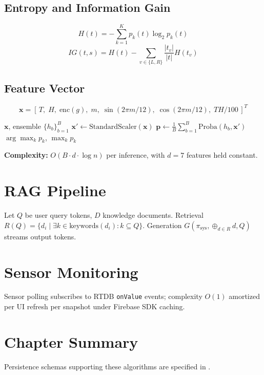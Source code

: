 \subsection{Entropy and Information Gain}
\begin{equation}
H(t) = - \sum_{k=1}^{K} p_k(t) \log_2 p_k(t)
\label{eq:entropy}
\end{equation}
\begin{equation}
IG(t,s) = H(t) - \sum_{v \in \{L,R\}} \frac{|t_v|}{|t|} H(t_v)
\label{eq:ig}
\end{equation}

\subsection{Feature Vector}
\begin{equation}
\mathbf{x} = [\,T,\; H,\; \text{enc}(g),\; m,\; \sin(2\pi m/12),\; \cos(2\pi m/12),\; TH/100\,]^T
\label{eq:feature_vector}
\end{equation}

\begin{algorithm}[htbp]
\caption{Random Forest Inference}
\label{alg:rf_infer}
\begin{algorithmic}[1]
\Require $\mathbf{x}$, ensemble $\{h_b\}_{b=1}^B$
\State $\mathbf{x}' \gets \text{StandardScaler}(\mathbf{x})$
\State $\mathbf{p} \gets \frac{1}{B}\sum_{b=1}^B \text{Proba}(h_b, \mathbf{x}')$
\State \Return $\arg\max_k p_k$, $\max_k p_k$
\end{algorithmic}
\end{algorithm}

\textbf{Complexity:} $O(B \cdot d \cdot \log n)$ per inference, with $d{=}7$ features held constant.

\section{RAG Pipeline}
\label{sec:algo_rag}

Let $Q$ be user query tokens, $D$ knowledge documents. Retrieval $R(Q)=\{d_i \mid \exists k \in \text{keywords}(d_i): k \subseteq Q\}$. Generation $G(\pi_{\text{sys}}, \oplus_{d \in R} d, Q)$ streams output tokens.



\section{Sensor Monitoring}
Sensor polling subscribes to RTDB \texttt{onValue} events; complexity $O(1)$ amortized per UI refresh per snapshot under Firebase SDK caching.

\section{Chapter Summary}
Persistence schemas supporting these algorithms are specified in .
